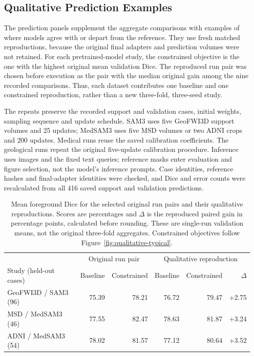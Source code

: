 \documentclass[12pt,a4paper]{article}
\begin{document}
\subsection{Qualitative Prediction Examples}
\label{sec:qualitative-predictions}

The prediction panels supplement the aggregate comparisons with examples
of where models agree with or depart from the reference. They use fresh
matched reproductions, because the original final adapters and prediction
volumes were not retained. For each pretrained-model study, the constrained
objective is the one with the highest original mean validation Dice.
The reproduced run pair was chosen before execution as the pair with the
median original gain among the nine recorded comparisons. Thus, each
dataset contributes one baseline and one constrained reproduction, rather
than a new three-fold, three-seed study.

The repeats preserve the recorded support and validation cases,
initial weights, sampling sequence and update schedule. SAM3 uses five
GeoFWI3D support volumes and 25 updates; MedSAM3 uses five MSD volumes or
two ADNI crops and 200 updates. Medical runs reuse the saved calibration
coefficients. The geological runs repeat the original five-update
calibration procedure. Inference uses images and the fixed text queries;
reference masks enter evaluation and figure selection, not the model's
inference prompts. Case identities, reference hashes and final-adapter
identities were checked, and Dice and error counts were recalculated from
all 416 saved support and validation predictions.

\begin{table}[htbp]
\centering\small{}
\renewcommand{\arraystretch}{1.2}
\begin{tabular}{@{}lrrrrr@{}}
\hline
& \multicolumn{2}{c}{Original run pair} &
\multicolumn{3}{c}{Qualitative reproduction} \\
Study (held-out cases) & Baseline & Constrained & Baseline & Constrained & $\Delta$ \\
\hline
GeoFWI3D / SAM3 (96) & 75.39 & 78.21 & 76.72 & 79.47 & +2.75 \\
MSD / MedSAM3 (46) & 77.55 & 82.47 & 78.63 & 81.87 & +3.24 \\
ADNI / MedSAM3 (54) & 78.02 & 81.57 & 77.12 & 80.64 & +3.52 \\
\hline
\end{tabular}
\caption{Mean foreground Dice for the selected original run pairs and
their qualitative reproductions. Scores are percentages and $\Delta$ is
the reproduced paired gain in percentage points, calculated before
rounding. These are single-run validation means, not the original
three-fold aggregates. Constrained objectives follow
Figure~\ref{fig:qualitative-typical}.}
\label{tab:qualitative-reproduction-scores}
\end{table}
\end{document}
